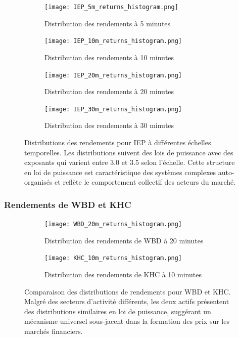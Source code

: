 \documentclass[12pt,a4paper]{article}
\theoremstyle{definition}
\theoremstyle{remark}
\begin{document}
\begin{figure}[h!]
    \centering
    \begin{subfigure}[b]{0.45\textwidth}
        \texttt{[image: IEP\_5m\_returns\_histogram.png]}
        \caption{Distribution des rendements à 5 minutes}
        \label{fig:IEP_5m}
    \end{subfigure}
    \hfill
    \begin{subfigure}[b]{0.45\textwidth}
        \texttt{[image: IEP\_10m\_returns\_histogram.png]}
        \caption{Distribution des rendements à 10 minutes}
        \label{fig:IEP_10m}
    \end{subfigure}
    
    \vspace{0.5cm}
    
    \begin{subfigure}[b]{0.45\textwidth}
        \texttt{[image: IEP\_20m\_returns\_histogram.png]}
        \caption{Distribution des rendements à 20 minutes}
        \label{fig:IEP_20m}
    \end{subfigure}
    \hfill
    \begin{subfigure}[b]{0.45\textwidth}
        \texttt{[image: IEP\_30m\_returns\_histogram.png]}
        \caption{Distribution des rendements à 30 minutes}
        \label{fig:IEP_30m}
    \end{subfigure}
    \caption{Distributions des rendements pour IEP à différentes échelles temporelles. Les distributions suivent des lois de puissance avec des exposants qui varient entre 3.0 et 3.5 selon l'échelle. Cette structure en loi de puissance est caractéristique des systèmes complexes auto-organisés et reflète le comportement collectif des acteurs du marché.}
    \label{fig:IEP_multi_scale}
\end{figure}

\subsubsection{Rendements de WBD et KHC}

\begin{figure}[h!]
    \centering
    \begin{subfigure}[b]{0.45\textwidth}
        \texttt{[image: WBD\_20m\_returns\_histogram.png]}
        \caption{Distribution des rendements de WBD à 20 minutes}
        \label{fig:WBD_20m}
    \end{subfigure}
    \hfill
    \begin{subfigure}[b]{0.45\textwidth}
        \texttt{[image: KHC\_10m\_returns\_histogram.png]}
        \caption{Distribution des rendements de KHC à 10 minutes}
        \label{fig:KHC_10m}
    \end{subfigure}
    \caption{Comparaison des distributions de rendements pour WBD et KHC. Malgré des secteurs d'activité différents, les deux actifs présentent des distributions similaires en loi de puissance, suggérant un mécanisme universel sous-jacent dans la formation des prix sur les marchés financiers.}
    \label{fig:WBD_KHC_returns}
\end{figure}
\end{document}
